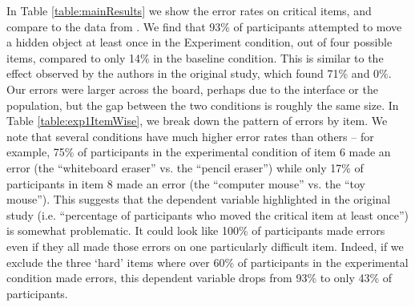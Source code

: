 \documentclass[10pt,letterpaper]{article}
\begin{document}
In Table \ref{table:mainResults} we show the error rates on critical items, and compare to the data from
.
We find that 93\% of participants attempted to move a hidden object at least once in the Experiment condition, out of four possible items, compared to only 14\% in the baseline condition. This is similar to the effect observed by the authors in the original study, which found 71\% and 0\%. Our errors were larger across the board, perhaps due to the interface or the population, but the gap between the two conditions is roughly the same size.
In Table \ref{table:exp1ItemWise}, we break down the pattern of errors by item. 
We note that several conditions have much higher error rates than others -- for example, 75\% of participants in the experimental condition of item 6 made an error (the ``whiteboard eraser'' vs. the ``pencil eraser'') while only 17\% of participants in item 8 made an error (the ``computer mouse'' vs. the ``toy mouse''). 
This suggests that the dependent variable highlighted in the original study (i.e. ``percentage of participants who moved the critical item at least once'') is somewhat problematic. It could look like 100\% of participants made errors even if they all made those errors on one particularly difficult item. Indeed, if we exclude the three `hard' items where over 60\% of participants in the experimental condition made errors, this dependent variable drops from 93\% to only 43\% of participants. 
\end{document}
